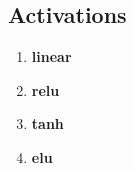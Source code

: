 \subsection{Activations}\label{sec:chapter3:activation}
\begin{enumerate}
  \item \textbf{linear}
  \item \textbf{relu}
  \item \textbf{tanh}
  \item \textbf{elu}
\end{enumerate}
